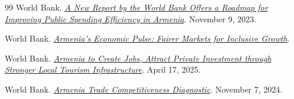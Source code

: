 \documentclass[12pt,a4paper]{report}
\begin{document}
\begin{thebibliography}{99}
World Bank.
\href{https://www.worldbank.org/en/news/press-release/2023/11/09/a-new-report-by-the-world-bank-offers-a-roadmap-for-improving-public-spending-efficiency-in-armenia}{\textit{A New Report by the World Bank Offers a Roadmap for Improving Public Spending Efficiency in Armenia}}.
November 9, 2023.

World Bank.
\href{https://www.worldbank.org/en/country/armenia/publication/armenia-economic-pulse-fairer-markets-for-inclusive-growth}{\textit{Armenia's Economic Pulse: Fairer Markets for Inclusive Growth}}.

World Bank.
\href{https://www.worldbank.org/en/news/press-release/2025/04/17/armenia-to-create-jobs-attract-private-investment-through-stronger-local-tourism-infrastructure}{\textit{Armenia to Create Jobs, Attract Private Investment through Stronger Local Tourism Infrastructure}}.
April 17, 2025.

World Bank.
\href{https://www.worldbank.org/en/news/factsheet/2024/11/07/armenia-trade-competitiveness-diagnostic}{\textit{Armenia Trade Competitiveness Diagnostic}}.
November 7, 2024.
\end{thebibliography}
\end{document}

